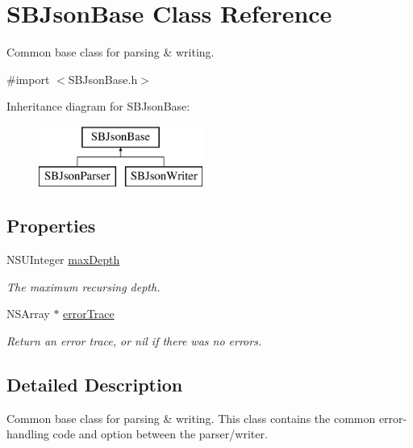 \hypertarget{interface_s_b_json_base}{
\section{SBJsonBase Class Reference}
\label{interface_s_b_json_base}
}


Common base class for parsing \& writing.  




{\ttfamily \#import $<$SBJsonBase.h$>$}

Inheritance diagram for SBJsonBase:\begin{figure}[H]
\begin{center}
\leavevmode
\includegraphics[height=2.000000cm]{interface_s_b_json_base}
\end{center}
\end{figure}
\subsection*{Properties}
\begin{DoxyCompactItemize}
\item 
NSUInteger \hyperlink{interface_s_b_json_base_abe3e47517711570a9a57e2d92a15055b}{maxDepth}
\begin{DoxyCompactList}\small\item\em The maximum recursing depth. \item\end{DoxyCompactList}\item 
NSArray $\ast$ \hyperlink{interface_s_b_json_base_aa83f0ee5efade2fd26ddf6591ffd8dc0}{errorTrace}
\begin{DoxyCompactList}\small\item\em Return an error trace, or nil if there was no errors. \item\end{DoxyCompactList}\end{DoxyCompactItemize}


\subsection{Detailed Description}
Common base class for parsing \& writing. This class contains the common error-\/handling code and option between the parser/writer. 

